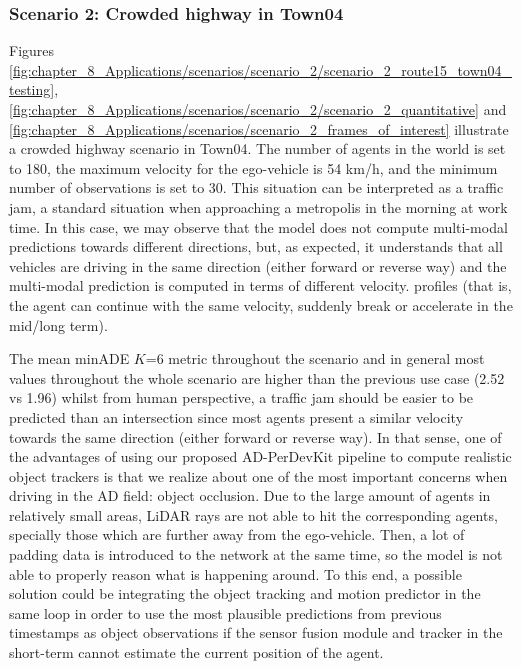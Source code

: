 \subsubsection{Scenario 2: Crowded highway in Town04}
\label{subsubsec:8_experimental_results_scenario_2}

Figures \ref{fig:chapter_8_Applications/scenarios/scenario_2/scenario_2_route15_town04_testing}, \ref{fig:chapter_8_Applications/scenarios/scenario_2/scenario_2_quantitative} and \ref{fig:chapter_8_Applications/scenarios/scenario_2_frames_of_interest} illustrate a crowded highway scenario in Town04. The number of agents in the world is set to 180, the maximum velocity for the ego-vehicle is 54 km/h, and the minimum number of observations is set to 30. This situation can be interpreted as a traffic jam, a standard situation when approaching a metropolis in the morning at work time. In this case, we may observe that the model does not compute multi-modal predictions towards different directions, but, as expected, it understands that all vehicles are driving in the same direction (either forward or reverse way) and the multi-modal prediction is computed in terms of different velocity. profiles (that is, the agent can continue with the same velocity, suddenly break or accelerate in the mid/long term).

The mean \ac{minADE} $K$=6 metric throughout the scenario and in general most values throughout the whole scenario are higher than the previous use case (2.52 vs 1.96) whilst from human perspective, a traffic jam should be easier to be predicted than an intersection since most agents present a similar velocity towards the same direction (either forward or reverse way). In that sense, one of the advantages of using our proposed \ac{AD-PerDevKit} pipeline to compute realistic object trackers is that we realize about one of the most important concerns when driving in the \ac{AD} field: object occlusion. Due to the large amount of agents in relatively small areas, \ac{LiDAR} rays are not able to hit the corresponding agents, specially those which are further away from the ego-vehicle. Then, a lot of padding data is introduced to the network at the same time, so the model is not able to properly reason what is happening around. To this end, a possible solution could be integrating the object tracking and motion predictor in the same loop in order to use the most plausible predictions from previous timestamps as object observations if the sensor fusion module and tracker in the short-term cannot estimate the current position of the agent. 

